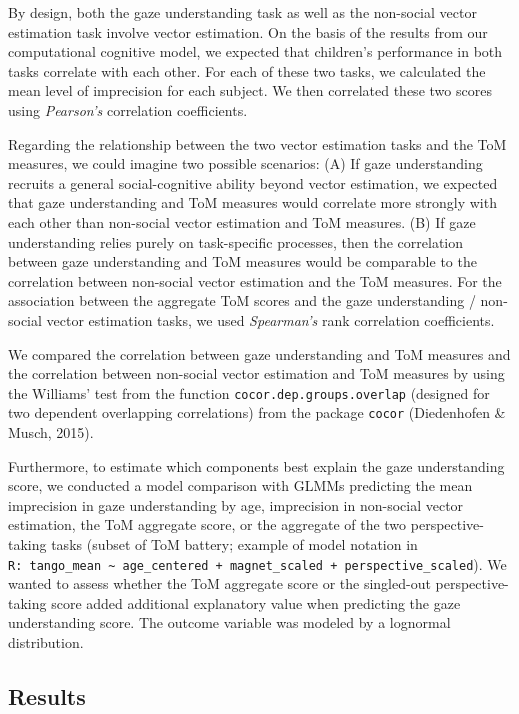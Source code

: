 \documentclass[
  man,floatsintext]{apa6}
\begin{document}
By design, both the gaze understanding task as well as the non-social vector estimation task involve vector estimation.
On the basis of the results from our computational cognitive model, we expected that children's performance in both tasks correlate with each other.
For each of these two tasks, we calculated the mean level of imprecision for each subject.
We then correlated these two scores using \emph{Pearson's} correlation coefficients.

Regarding the relationship between the two vector estimation tasks and the ToM measures, we could imagine two possible scenarios: (A) If gaze understanding recruits a general social-cognitive ability beyond vector estimation, we expected that gaze understanding and ToM measures would correlate more strongly with each other than non-social vector estimation and ToM measures.
(B) If gaze understanding relies purely on task-specific processes, then the correlation between gaze understanding and ToM measures would be comparable to the correlation between non-social vector estimation and the ToM measures.
For the association between the aggregate ToM scores and the gaze understanding / non-social vector estimation tasks, we used \emph{Spearman's} rank correlation coefficients.

We compared the correlation between gaze understanding and ToM measures and the correlation between non-social vector estimation and ToM measures by using the Williams' test from the function \texttt{cocor.dep.groups.overlap} (designed for two dependent overlapping correlations) from the package \texttt{cocor} (Diedenhofen \& Musch, 2015).

Furthermore, to estimate which components best explain the gaze understanding score, we conducted a model comparison with GLMMs predicting the mean imprecision in gaze understanding by age, imprecision in non-social vector estimation, the ToM aggregate score, or the aggregate of the two perspective-taking tasks (subset of ToM battery; example of model notation in \texttt{R:\ tango\_mean\ \textasciitilde{}\ age\_centered\ +\ magnet\_scaled\ +\ perspective\_scaled}).
We wanted to assess whether the ToM aggregate score or the singled-out perspective-taking score added additional explanatory value when predicting the gaze understanding score.
The outcome variable was modeled by a lognormal distribution.

\hypertarget{results-2}{%
\subsection{Results}\label{results-2}}
\end{document}
